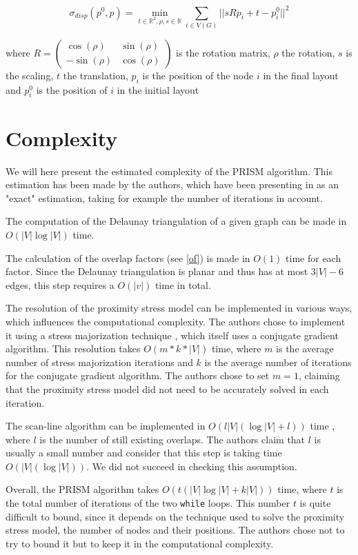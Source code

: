 \documentclass[12pt]{report}
\begin{document}
\[\sigma_{disp}(p^0, p) = \min_{t \in \mathbb{R}^2, \rho, s \in \mathbb{R}} 
\sum_{i \in V(G)} || s R p_i + t - p_i^0||^2 \]

where $R = \begin{pmatrix} \cos(\rho) & \sin(\rho) \\ -\sin(\rho) & \cos(\rho) \end{pmatrix}$ is the rotation matrix, $\rho$ the rotation, $s$ is the scaling, $t$ the translation, $p_i$ is the position of the node $i$ in the final layout and $p_i^0$ is the position of $i$ in the initial layout

\section{Complexity}

We will here present the estimated complexity of the PRISM algorithm. This estimation has been made by the authors, which have been presenting in as an "exact" estimation, taking for example the number of iterations in account.

The computation of the Delaunay triangulation of a given graph can be made in $O(|V| \log |V|)$ time.

The calculation of the overlap factors (see \ref{of}) is made in $O(1)$ time for each factor. Since the Delaunay triangulation is planar and thus has at most $3|V| -6$ edges, this step requires a $O(|v|)$ time in total.

The resolution of the proximity stress model can be implemented in various ways, which influences the computational complexity. The authors chose to implement it using a stress majorization technique \cite{Gansner05}, which itself uses a conjugate gradient algorithm. This resolution takes $O(m*k*|V|)$ time, where $m$ is the average number of stress majorization iterations and $k$ is the average number of iterations for the conjugate gradient algorithm. The authors chose to set $m =1$, claiming that the proximity stress model did not need to be accurately solved in each iteration.

The scan-line algorithm can be implemented in $O(l |V| (\log |V| + l))$ time \cite{VPSC06}, where $l$ is the number of still existing overlaps. The authors claim that $l$ is usually a small number and consider that this step is taking time $O(|V| (\log |V|))$. We did not succeed in checking this assumption.

Overall, the PRISM algorithm takes $O(t(|V| \log |V| + k|V|))$ time, where $t$ is the total number of iterations of the two \texttt{while} loops. This number $t$ is quite difficult to bound, since it depends on the technique used to solve the proximity stress model, the number of nodes and their positions. The authors chose not to try to bound it but to keep it in the computational complexity.
\end{document}

